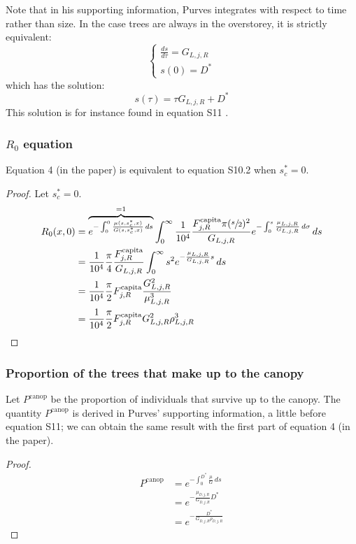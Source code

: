 \documentclass[letterpaper, 12pt]{article}
\newcommand {\s}{{s}^{*}}
\theoremstyle{theo}
\begin{document}
\begin{refsection}
\begin{onehalfspace}
Note that in his supporting information, Purves integrates with respect to time rather than size. In the case trees are always in the overstorey, it is strictly equivalent:
\[
	\begin{cases}
		\frac{ds}{d \tau} = G_{L, j, R} \\
		s(0) = D^{*}
	\end{cases}
\]
which has the solution:
\[
	s(\tau) = \tau G_{L, j, R} + D^{*}
\]
This solution is for instance found in equation S11 \citep{Purves2009}.

\subsubsection{$ R_0 $ equation \citep[p. 1479]{Purves2009}}
Equation 4 (in the paper) is equivalent to equation S10.2 \citep[also p. 1479 in his article]{Purves2009} when $ \s_c = 0 $.
\begin{proof}
	Let $ \s_c = 0 $.
	\begin{align*}
		R_0 (x, 0) &= \overbrace{e^{-\int_0^{0}\frac{\mu(s, \s_c, x)}{G(s, \s_c, x)} \, ds}}^{= 1} \int_{0}^{\infty} \frac{1}{10^4} \frac{F_{j, R}^{\text{capita}} \pi (\sfrac{s}{2})^2}{G_{L, j, R}} e^{-\int_{0}^{s} \frac{\mu_{L, j, R}}{G_{L, j, R}} \, d\sigma} \, ds \\
			&= \frac{1}{10^4} \frac{\pi}{4} \frac{F_{j, R}^{\text{capita}}}{G_{L, j, R}} \int_{0}^{\infty} s^2 e^{-\frac{\mu_{L, j, R}}{G_{L, j, R}} s} \, ds \\
			&= \frac{1}{10^4} \frac{\pi}{2} F_{j, R}^{\text{capita}} \frac{G_{L, j, R}^2}{\mu_{L, j, R}^3} \\
			&= \frac{1}{10^4} \frac{\pi}{2} F_{j, R}^{\text{capita}} G_{L, j, R}^2 \rho_{L, j, R}^3
	\end{align*}
\end{proof}

\subsubsection{Proportion of the trees that make up to the canopy}
Let $ P^{\text{canop}} $ be the proportion of individuals that survive up to the canopy. The quantity $ P^{\text{canop}} $ is derived in Purves' supporting information, a little before equation S11; we can obtain the same result with the first part of equation 4 (in the paper).
\begin{proof}
	\begin{align*}
		P^{\text{canop}} &= e^{-\int_{0}^{D^{*}} \frac{\mu}{G} \, ds} \\
			&= e^{-\frac{\mu_{D, j, R}}{G_{D, j, R}} D^{*}} \\
			&= e^{-\frac{D^{*}}{G_{D, j, R}\rho_{D, j, R}}}
	\end{align*}
\end{proof}


\end{onehalfspace}
\end{refsection}
\end{document}
